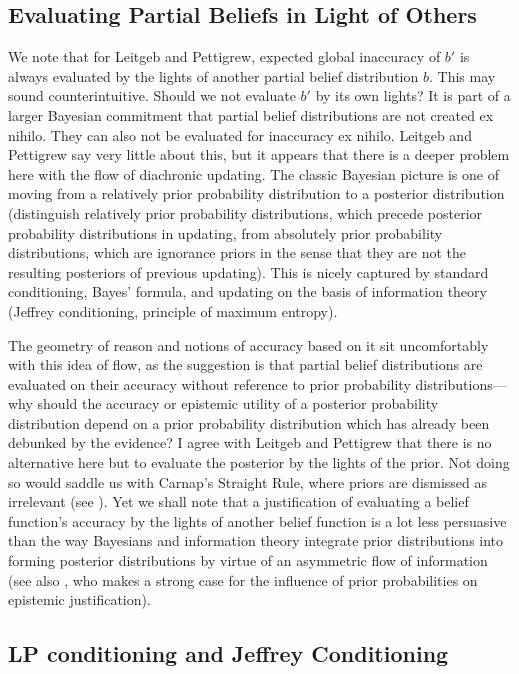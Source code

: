 \documentclass[11pt]{article}
\begin{document}
\subsection{Evaluating Partial Beliefs in Light of Others}
\label{subsec:aichavag}

We note that for Leitgeb and Pettigrew, expected global inaccuracy of
$b'$ is always evaluated by the lights of another partial belief
distribution $b$. This may sound counterintuitive. Should we not
evaluate $b'$ by its own lights? It is part of a larger Bayesian
commitment that partial belief distributions are not created ex
nihilo. They can also not be evaluated for inaccuracy ex nihilo.
Leitgeb and Pettigrew say very little about this, but it appears that
there is a deeper problem here with the flow of diachronic updating.
The classic Bayesian picture is one of moving from a relatively prior
probability distribution to a posterior distribution (distinguish
relatively prior probability distributions, which precede posterior
probability distributions in updating, from absolutely prior
probability distributions, which are ignorance priors in the sense
that they are not the resulting posteriors of previous updating). This
is nicely captured by standard conditioning, Bayes' formula, and
updating on the basis of information theory (Jeffrey conditioning,
principle of maximum entropy).

The geometry of reason and notions of accuracy based on it sit
uncomfortably with this idea of flow, as the suggestion is that
partial belief distributions are evaluated on their accuracy without
reference to prior probability distributions---why should the
accuracy or epistemic utility of a posterior probability distribution
depend on a prior probability distribution which has already been
debunked by the evidence? I agree with Leitgeb and Pettigrew that
there is no alternative here but to evaluate the posterior by the
lights of the prior. Not doing so would saddle us with Carnap's
Straight Rule, where priors are dismissed as irrelevant (see
). Yet we shall note that a justification of
evaluating a belief function's accuracy by the lights of another
belief function is a lot less persuasive than the way Bayesians and
information theory integrate prior distributions into forming
posterior distributions by virtue of an asymmetric flow of
information (see also , who makes a strong case
for the influence of prior probabilities on epistemic justification).

\subsection{LP conditioning and Jeffrey Conditioning}
\label{subsec:meexughi}
\end{document}
